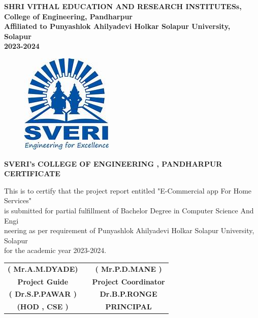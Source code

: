 \documentclass[12pt]{article}
\begin{document}
\begin{center}
\textbf{SHRI VITHAL EDUCATION AND RESEARCH INSTITUTESs,\\[2mm]
College of Engineering, Pandharpur\\[3mm]
Affiliated to Punyashlok Ahilyadevi Holkar Solapur University, Solapur\\[2mm]
2023-2024}
\end{center}  
 
\clearpage


\begin{figure}[h]
 \centering
 \includegraphics[scale=1]{sveri2logo}
\end{figure}

\begin{center}
 \large \textbf { SVERI's COLLEGE OF ENGINEERING , PANDHARPUR }\\[7mm]
 \textbf{CERTIFICATE}\\[7mm]
 \end{center} 
 This is to certify that the project report entitled "E-Commercial app For Home Services"\\[2mm] is submitted for partial fulfillment of Bachelor Degree in Computer Science And Engi\\[2mm]neering as per requirement of Punyashlok Ahilyadevi Holkar Solapur University, Solapur\\[2mm] for the academic year 2023-2024.\\[30mm] 
 

 
 \begin{tabular}{ c c c } 
 \textbf{( Mr.A.M.DYADE)} & \hspace{2.0in} & \textbf{( Mr.P.D.MANE )} \\ [1mm] 
 \textbf {Project Guide} & \hspace{2.0in} & \textbf{Project Coordinator}\\[30mm]
 \textbf{( Dr.S.P.PAWAR )} & \hspace{2.0in}  & \textbf{Dr.B.P.RONGE}\\[1mm]
 \textbf{(HOD , CSE )} & \hspace{2.0in}  & \textbf{ PRINCIPAL }\\[30mm]
 \end{tabular}
 
\end{document}
